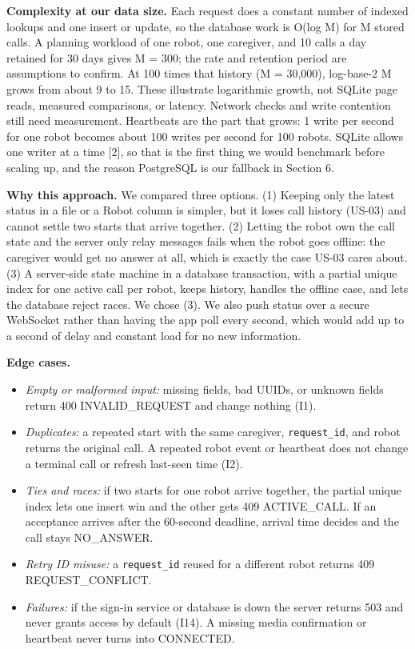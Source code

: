 \documentclass[12pt,letterpaper]{article}
\newcommand{\field}[1]{\texttt{#1}}
\begin{document}
\textbf{Complexity at our data size.} Each request does a constant number of indexed lookups and one insert or update, so the database work is O(log M) for M stored calls. A planning workload of one robot, one caregiver, and 10 calls a day retained for 30 days gives M = 300; the rate and retention period are assumptions to confirm. At 100 times that history (M = 30,000), log-base-2 M grows from about 9 to 15. These illustrate logarithmic growth, not SQLite page reads, measured comparisons, or latency. Network checks and write contention still need measurement. Heartbeats are the part that grows: 1 write per second for one robot becomes about 100 writes per second for 100 robots. SQLite allows one writer at a time [2], so that is the first thing we would benchmark before scaling up, and the reason PostgreSQL is our fallback in Section 6.

\textbf{Why this approach.} We compared three options. (1) Keeping only the latest status in a file or a Robot column is simpler, but it loses call history (US-03) and cannot settle two starts that arrive together. (2) Letting the robot own the call state and the server only relay messages fails when the robot goes offline: the caregiver would get no answer at all, which is exactly the case US-03 cares about. (3) A server-side state machine in a database transaction, with a partial unique index for one active call per robot, keeps history, handles the offline case, and lets the database reject races. We chose (3). We also push status over a secure WebSocket rather than having the app poll every second, which would add up to a second of delay and constant load for no new information.

\textbf{Edge cases.}
\begin{itemize}\setlength{\itemsep}{2pt}
\item \emph{Empty or malformed input:} missing fields, bad UUIDs, or unknown fields return 400 INVALID\_REQUEST and change nothing (I1).
\item \emph{Duplicates:} a repeated start with the same caregiver, \field{request\_id}, and robot returns the original call. A repeated robot event or heartbeat does not change a terminal call or refresh last-seen time (I2).
\item \emph{Ties and races:} if two starts for one robot arrive together, the partial unique index lets one insert win and the other gets 409 ACTIVE\_CALL. If an acceptance arrives after the 60-second deadline, arrival time decides and the call stays NO\_ANSWER.
\item \emph{Retry ID misuse:} a \field{request\_id} reused for a different robot returns 409 REQUEST\_CONFLICT.
\item \emph{Failures:} if the sign-in service or database is down the server returns 503 and never grants access by default (I14). A missing media confirmation or heartbeat never turns into CONNECTED.
\end{itemize}
\end{document}
